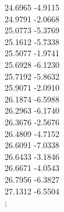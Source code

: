 {    24.6965	-4.9115\\
    24.9791	-2.0668\\
    25.0773	-5.3769\\
    25.1612	-5.7338\\
    25.5077	-1.9741\\
    25.6928	-6.1230\\
    25.7192	-5.8632\\
    25.9071	-2.0910\\
    26.1874	-6.5988\\
    26.2963	-6.1740\\
    26.3676	-2.5676\\
    26.4809	-4.7152\\
    26.6091	-7.0338\\
    26.6433	-3.1846\\
    26.6671	-4.0543\\
    26.7956	-6.3827\\
    27.1312	-6.5504\\
    }
    ;


